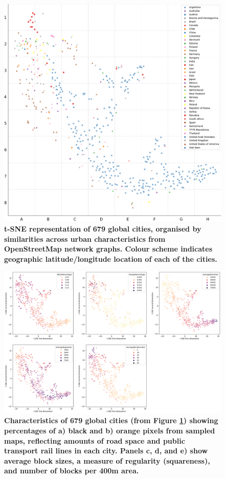 \documentclass[preprint,12pt]{elsarticle}
\begin{document}
\begin{figure}
\centering
\includegraphics[trim={ 0 0 0 0 },clip,scale=0.45]{Images/tSNE Country.png}
\caption{\bf t-SNE representation of 679 global cities, organised by similarities across urban characteristics from OpenStreetMap network graphs. Colour scheme indicates geographic latitude/longitude location\cite{Jackle2017} of each of the cities.}
 \label{fig:tSNE}
\end{figure}


\begin{figure}
\centering
\includegraphics[trim={ 0 0 0 0 },clip,scale=0.35]{Images/City Types Dimensions.png}
\caption{\bf Characteristics of 679 global cities (from Figure \ref{fig:tSNE}) showing percentages of a) black and b) orange pixels from sampled maps\cite{Thompson2020}, reflecting amounts of road space and public transport rail lines in each city. Panels c, d, and e) show average block sizes, a measure of regularity (squareness), and number of blocks per 400m area\cite{Nice2019b}.}
 \label{fig:Dimensions}
\end{figure}
\end{document}
